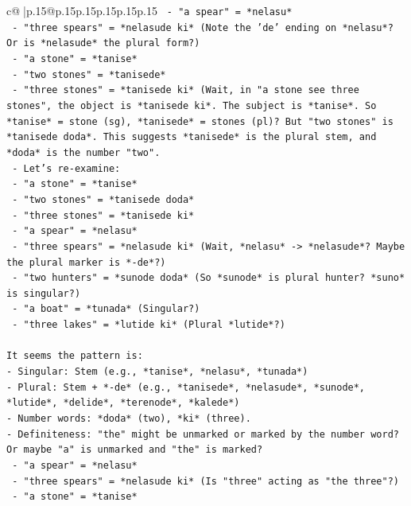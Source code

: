 \documentclass{article}
\begin{document}
{\begin{supertabular}{c@{$\;$}|p{.15\linewidth}@{}p{.15\linewidth}p{.15\linewidth}p{.15\linewidth}p{.15\linewidth}p{.15\linewidth}}
{{{\texttt{  {-} "a spear" = *nelasu*} \\
\texttt{  {-} "three spears" = *nelasude ki* (Note the 'de' ending on *nelasu*? Or is *nelasude* the plural form?)} \\
\texttt{  {-} "a stone" = *tanise*} \\
\texttt{  {-} "two stones" = *tanisede*} \\
\texttt{  {-} "three stones" = *tanisede ki* (Wait, in "a stone see three stones", the object is *tanisede ki*. The subject is *tanise*. So *tanise* = stone (sg), *tanisede* = stones (pl)? But "two stones" is *tanisede doda*. This suggests *tanisede* is the plural stem, and *doda* is the number "two".} \\
\texttt{  {-} Let's re{-}examine:} \\
\texttt{    {-} "a stone" = *tanise*} \\
\texttt{    {-} "two stones" = *tanisede doda*} \\
\texttt{    {-} "three stones" = *tanisede ki*} \\
\texttt{    {-} "a spear" = *nelasu*} \\
\texttt{    {-} "three spears" = *nelasude ki* (Wait, *nelasu* {-}> *nelasude*? Maybe the plural marker is *{-}de*?)} \\
\texttt{    {-} "two hunters" = *sunode doda* (So *sunode* is plural hunter? *suno* is singular?)} \\
\texttt{    {-} "a boat" = *tunada* (Singular?)} \\
\texttt{    {-} "three lakes" = *lutide ki* (Plural *lutide*?)} \\
\\ 
\texttt{It seems the pattern is:} \\
\texttt{{-} Singular: Stem (e.g., *tanise*, *nelasu*, *tunada*)} \\
\texttt{{-} Plural: Stem + *{-}de* (e.g., *tanisede*, *nelasude*, *sunode*, *lutide*, *delide*, *terenode*, *kalede*)} \\
\texttt{{-} Number words: *doda* (two), *ki* (three).} \\
\texttt{{-} Definiteness: "the" might be unmarked or marked by the number word? Or maybe "a" is unmarked and "the" is marked?} \\
\texttt{  {-} "a spear" = *nelasu*} \\
\texttt{  {-} "three spears" = *nelasude ki* (Is "three" acting as "the three"?)} \\
\texttt{  {-} "a stone" = *tanise*} \\
}}}
\end{supertabular}}
\end{document}
